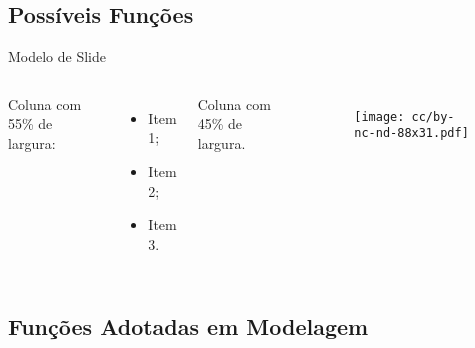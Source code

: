 \subsection{Possíveis Funções}

    \begin{frame}{Modelo de Slide}\vspace*{-2em}
        \begin{columns}
            Coluna com 55\% de largura:\\[\smallskipamount]
            \begin{itemize}
                \item<1-> Item 1;
                \item<2-> Item 2;
                \item<3-> Item 3.
            \end{itemize}
            Coluna com 45\% de largura.
            \begin{figure}
                \texttt{[image: cc/by-nc-nd-88x31.pdf]}
            \end{figure}
        \end{columns}
    \end{frame}

\subsection{Funções Adotadas em Modelagem}

